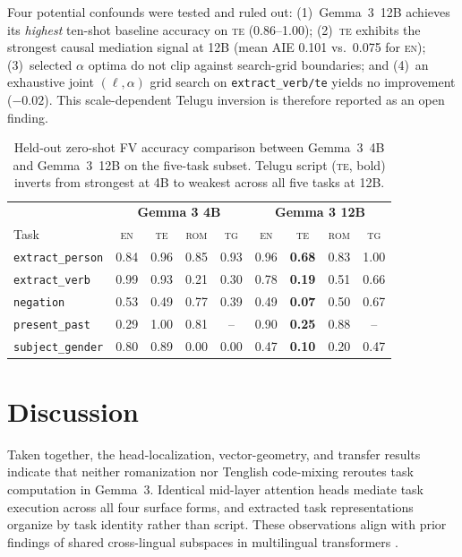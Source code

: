 \documentclass[11pt]{article}
\newcommand{\cond}[1]{\textsc{#1}}
\begin{document}
Four potential confounds were tested and ruled out: (1)~Gemma~3~12B achieves
its \emph{highest} ten-shot baseline accuracy on \cond{te} (0.86--1.00);
(2)~\cond{te} exhibits the strongest causal mediation signal at 12B (mean AIE
0.101 vs.\ 0.075 for \cond{en}); (3)~selected $\alpha$ optima do not clip
against search-grid boundaries; and (4)~an exhaustive joint $(\ell,\alpha)$
grid search on \texttt{extract\_verb/te} yields no improvement ($-0.02$). This
scale-dependent Telugu inversion is therefore reported as an open finding.

\begin{table}[t]
\centering
\small
\begin{tabular}{lcccc|cccc}
\toprule
& \multicolumn{4}{c|}{\textbf{Gemma 3 4B}} & \multicolumn{4}{c}{\textbf{Gemma 3 12B}} \\
Task & \cond{en} & \cond{te} & \cond{rom} & \cond{tg} & \cond{en} & \cond{te} & \cond{rom} & \cond{tg} \\
\midrule
\texttt{extract\_person} & 0.84 & 0.96 & 0.85 & 0.93 & 0.96 & \textbf{0.68} & 0.83 & 1.00 \\
\texttt{extract\_verb}   & 0.99 & 0.93 & 0.21 & 0.30 & 0.78 & \textbf{0.19} & 0.51 & 0.66 \\
\texttt{negation}        & 0.53 & 0.49 & 0.77 & 0.39 & 0.49 & \textbf{0.07} & 0.50 & 0.67 \\
\texttt{present\_past}   & 0.29 & 1.00 & 0.81 & --   & 0.90 & \textbf{0.25} & 0.88 & --   \\
\texttt{subject\_gender} & 0.80 & 0.89 & 0.00 & 0.00 & 0.47 & \textbf{0.10} & 0.20 & 0.47 \\
\bottomrule
\end{tabular}
\caption{Held-out zero-shot FV accuracy comparison between Gemma~3~4B and
  Gemma~3~12B on the five-task subset. Telugu script (\cond{te}, bold) inverts
  from strongest at 4B to weakest across all five tasks at 12B.}
\label{tab:scale12b}
\end{table}

\section{Discussion}

Taken together, the head-localization, vector-geometry, and transfer results
indicate that neither romanization nor Tenglish code-mixing reroutes task
computation in Gemma~3. Identical mid-layer attention heads mediate task
execution across all four surface forms, and extracted task representations
organize by task identity rather than script. These observations align with
prior findings of shared cross-lingual subspaces in multilingual transformers
\cite{pires2019multilingual,conneau2020emerging}.
\end{document}
